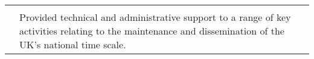 \begin{longtable}{p{\firstcolumnwidth}p{\secondcolumnwidth}}
& \\
& Provided technical and administrative support to a range of key activities relating to the maintenance and dissemination of the UK's national time scale.\\
\end{longtable}

